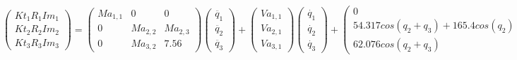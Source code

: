 \[
	\begin{pmatrix}
	Kt_{1}R_{1}Im_{1} \\
	Kt_{2}R_{2}Im_{2} \\
	Kt_{3}R_{3}Im_{3}
	\end{pmatrix} =
	\begin{pmatrix}
	Ma_{1,1} & 0 & 0 \\
	0 & Ma_{2,2} & Ma_{2,3}\\
	0 & Ma_{3,2} & 7.56
	\end{pmatrix}
	\begin{pmatrix}
	\ddot{q_{1}} \\
	\ddot{q_{2}}  \\
	\ddot{q_{3}}
\end{pmatrix} +
\begin{pmatrix}
	Va_{1,1}\\
	Va_{2,1} \\
  Va_{3,1}
\end{pmatrix}
\begin{pmatrix}
		\dot{q_{1}} \\
		\dot{q_{2}}  \\
		\dot{q_{3}}
\end{pmatrix} +
\begin{pmatrix}
0	\\
54.317cos(q_2 + q_3) + 165.4cos(q_2) \\
62.076cos(q_2 + q_3)
\end{pmatrix}
\]


